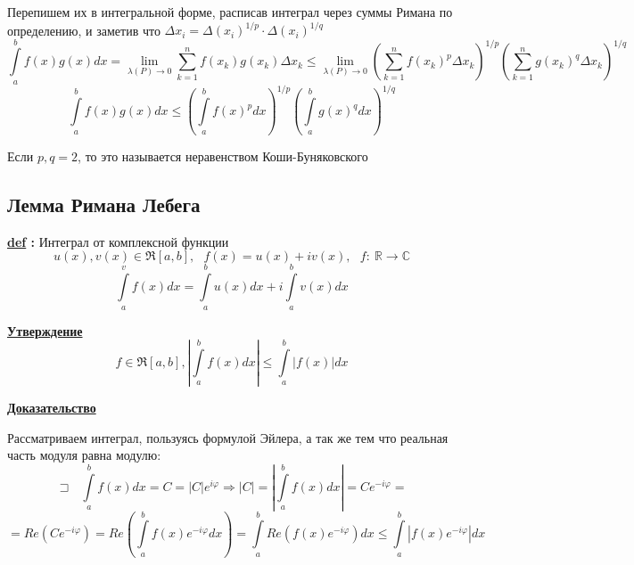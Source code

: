 \documentclass[a4paper,11pt]{article}
\renewcommand{\phi}{\ensuremath{\varphi}}
\newcommand{\Def}[1]{ 
\noindent\makebox[\linewidth]{\rule{\textwidth}{1pt}} 

 \noindent \textbf{\underline{def} :}
#1 

\noindent\makebox[\linewidth]{\rule{\textwidth}{1pt}} }
\newcommand{\R}{\mathbb{R}}
\newcommand{\im}{\mathbb{C}}
\newcommand{\Let}{\sqsupset}
\newcommand{\ubf}[1]{ \noindent\textbf{\underline{#1}}}
\newcommand{\Sum}{\sum\limits_{k = 1}^n}
\begin{document}
Перепишем их в интегральной форме, расписав интеграл через суммы Римана по определению, и заметив что $\Delta x_i = \Delta (x_i)^{1/p} \cdot \Delta (x_i)^{1/q}$
\[
\int\limits_a^bf(x)g(x)dx = \lim\limits_{\lambda(P) \to 0} \Sum f(x_k)g(x_k)\Delta x_k \leq \lim\limits_{\lambda(P) \to 0} \left( \Sum f(x_k)^p \Delta x_k \right)^{1/p} \left( \Sum g(x_k)^{q}\Delta x_k \right)^{1/q} 
\]
\[
\int\limits_a^bf(x)g(x)dx \leq \left( \int\limits_a^b f(x)^pdx \right)^{1/p}  \left( \int\limits_a^b g(x)^qdx \right)^{1/q} 
\]

Если $p, q = 2$, то это называется неравенством Коши-Буняковского

\subsection{Лемма Римана Лебега}
\Def{Интеграл от комплексной функции \label{def:imfunc} 
\[
u(x), v(x) \in \Re[a, b], \ \ \ f(x) = u(x) + iv(x), \ \ \ f: \ \R \to \im
\]
\[
\int\limits_a^v f(x)dx = \int\limits_a^b u(x)dx + i \int\limits_a^b v(x)dx
\]
}
\ubf{Утверждение}
\[
f \in \Re[a, b], \left|\int\limits_a^b f(x)dx \right| \leq \int\limits_a^b |f(x)|dx
\]

\ubf{Доказательство}

Рассматриваем интеграл, пользуясь формулой Эйлера, а так же тем что реальная часть модуля равна модулю:
\[
\Let \ \ \ \int\limits_a^b f(x)dx = C = |C| e^{i\phi} \Rightarrow |C| = \left| \int\limits_a^b f(x)dx \right| = C e^{-i\phi} =
\]
\[= Re(Ce^{-i\phi}) = Re(\int\limits_a^b f(x)e^{-i\phi}dx) = \int\limits_a^b Re(f(x)e^{-i\phi})dx \leq \int\limits_a^b |f(x)e^{-i\phi}|dx
\]
\end{document}
